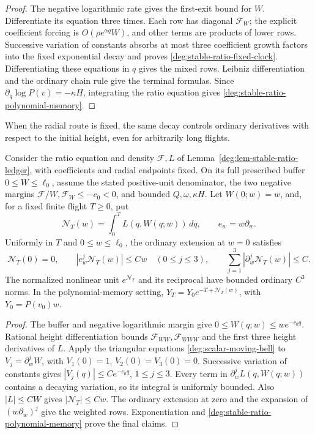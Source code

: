 \begin{proof}
The negative logarithmic rate gives the first-exit bound for \(W\).
Differentiate its equation three times. Each row has diagonal
\(\mathcal F_W\); the explicit coefficient forcing is
\(O(\rho e^{\alpha q}W)\), and other terms are products of lower
rows. Successive variation of constants absorbs at most three
coefficient growth factors into the fixed exponential decay and
proves \eqref{deg:stable-ratio-fixed-clock}. Differentiating these
equations in \(q\) gives the mixed rows. Leibniz differentiation and
the ordinary chain rule give the terminal formulas.
Since \(\partial_q\log P(v)=-\kappa H\), integrating the ratio
equation gives \eqref{deg:stable-ratio-polynomial-memory}.
\end{proof}

When the radial route is fixed, the same decay controls ordinary
derivatives with respect to the initial height, even for arbitrarily
long flights.

\begin{lemma}
\label{deg:lem-fixed-route-height-rows}
Consider the ratio equation and density \(\mathcal F,L\) of
Lemma~\ref{deg:lem-stable-ratio-ledger}, with coefficients and radial
endpoints fixed. On its full prescribed buffer \(0\le W\le\ell_0\),
assume the stated positive-unit denominator, the two negative margins
\(\mathcal F/W,\mathcal F_W\le-c_0<0\), and bounded
\(Q,\omega,\kappa H\). Let \(W(0;w)=w\), and, for a fixed finite
flight \(T\ge0\), put
\[
 \mathcal N_T(w)=\int_0^T L(q,W(q;w))\,dq,\qquad e_w=w\partial_w.
\]
Uniformly in \(T\) and \(0\le w\le\ell_0\), the ordinary extension
at \(w=0\) satisfies
\[
 \mathcal N_T(0)=0,\qquad
 |e_w^j\mathcal N_T(w)|\le Cw\quad(0\le j\le3),\qquad
 \sum_{j=1}^3|\partial_w^j\mathcal N_T(w)|\le C.
\]
The normalized nonlinear unit \(e^{\mathcal N_T}\) and its reciprocal
have bounded ordinary \(C^3\) norms. In the polynomial-memory setting,
\(Y_T=Y_0e^{-T+\mathcal N_T(w)}\), with \(Y_0=P(v_0)w\).
\end{lemma}
\begin{proof}
The buffer and negative logarithmic margin give
\(0\le W(q;w)\le we^{-c_0q}\). Rational height differentiation
bounds \(\mathcal F_{WW},\mathcal F_{WWW}\) and the first three
height derivatives of \(L\). Apply the triangular equations
\eqref{deg:scalar-moving-bell} to \(V_j=\partial_w^jW\), with
\(V_1(0)=1\), \(V_2(0)=V_3(0)=0\). Successive variation of
constants gives \(|V_j(q)|\le Ce^{-c_0q}\), \(1\le j\le3\).
Every term in \(\partial_w^jL(q,W(q;w))\) contains a decaying
variation, so its integral is uniformly bounded. Also \(|L|\le CW\)
gives \(|\mathcal N_T|\le Cw\). The ordinary extension at zero and
the expansion of \((w\partial_w)^j\) give the weighted rows.
Exponentiation and
\eqref{deg:stable-ratio-polynomial-memory} prove the final claims.
\end{proof}

